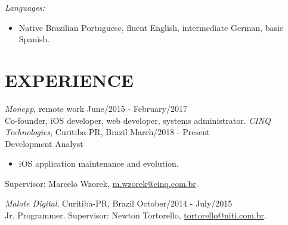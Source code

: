 \documentclass[margin]{res}
\begin{document}
\begin{resume}
			{\sl Languages:}
			\begin{itemize}
				\item[] Native Brazilian Portuguese, fluent English, intermediate German, basic Spanish.
			\end{itemize}

 		\section{EXPERIENCE}
 			{\sl Monepp}, remote work \hfill June/2015 - February/2017 \\
			Co-founder, iOS developer, web developer, systems administrator.
 			{\sl CINQ Technologies}, Curitiba-PR, Brazil \hfill March/2018 - Present \\
 			Development Analyst
 			\begin{itemize}
				\itemsep -2pt
		    	\item iOS application maintenance and evolution.
			\end{itemize}
			Supervisor: Marcelo Wzorek, \href{mailto:m.wzorek@cinq.com.br}{m.wzorek@cinq.com.br}.
 		
			{\sl Malote Digital}, Curitiba-PR, Brazil \hfill October/2014 - July/2015 \\
			Jr. Programmer.
			Supervisor: Newton Tortorello, \href{mailto:tortorello@niti.com.br}{tortorello@niti.com.br}.


\end{resume}
\end{document}
